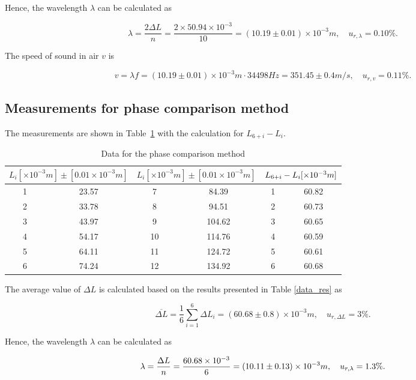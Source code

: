Hence, the wavelength $\lambda$ can be calculated as

\[
        \lambda=\frac{2\Delta L}{n}=\frac{2\times50.94\times 10^{-3} }{10}=(10.19 \pm0.01)\times 10^{-3} m,\quad u_{r,\lambda}=0.10\%.
\]

The speed of sound in air $v$ is

\[
    v=\lambda f = (10.19 \pm 0.01)\times 10^{-3} m \cdot 34498 Hz  = 351.45 \pm 0.4 m/s,\quad u_{r,v}=0.11\%.
\]

\subsection{Measurements for phase comparison method}

The measurements are shown in Table~\ref{data_pha} with the calculation for $L_{6+i}-L_i$.

\begin{table}[H] \small
    \centering
    \begin{tabular}{|c|c|c|c|c|c|}
    \hline
        \multicolumn{2}{|c|}{$L_i[\times 10^{-3} m]\pm[0.01\times 10^{-3} m]$} & 
        \multicolumn{2}{|c|}{$L_i[\times 10^{-3} m]\pm[0.01\times 10^{-3} m]$} &
        \multicolumn{2}{|c|}{$L_{6+i}-L_i[\times 10^{-3}m]$}\\\hline
        1 & 23.57 & 7  &  84.39 & 1 & 60.82 \\\hline
        2 & 33.78 & 8  &  94.51 & 2 & 60.73 \\\hline
        3 & 43.97 & 9  & 104.62 & 3 & 60.65 \\\hline
        4 & 54.17 & 10 & 114.76 & 4 & 60.59 \\\hline
        5 & 64.11 & 11 & 124.72 & 5 & 60.61 \\\hline
        6 & 74.24 & 12 & 134.92 & 6 & 60.68 \\\hline
    \end{tabular}
    \caption{Data for the phase comparison method}\label{data_pha}
\end{table}
    
The average value of $\Delta L$ is calculated  based on the results presented in Table \ref{data_res} as

\[
    \overline{\Delta L}=\frac{1}{6}\sum_{i=1}^{6}\Delta L_i=(60.68\pm 0.8)\times 10^{-3} m,\quad u_{r,\Delta L}=3\%.
\]

Hence, the wavelength $\lambda$ can be calculated as

\[
    \lambda=\frac{\Delta L}{n}=\frac{60.68 \times 10^{-3}}{6}=(10.11 \pm 0.13)\times 10^{-3} m,\quad u_{r,\lambda}=1.3\%.
\]

